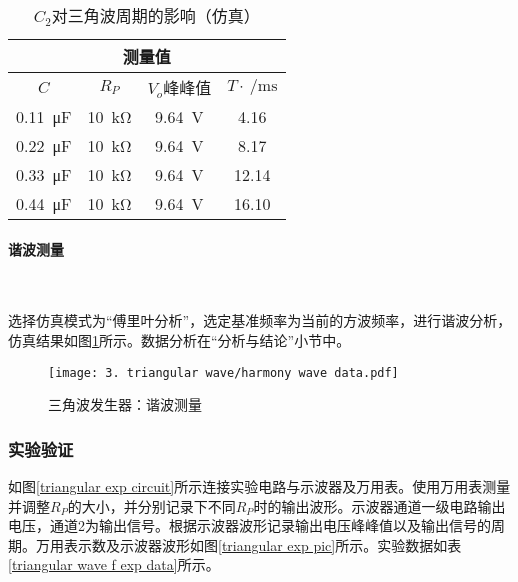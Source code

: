 \documentclass[UTF8]{ctexart}
\numberwithin{figure}{subsection}
\numberwithin{table}{subsection}
\numberwithin{equation}{subsection}
\begin{document}
\begin{table}[h]
    \begin{center}
        \caption{\(C_2\)对三角波周期的影响（仿真）}
        \begin{tabular}{|c|c|c|c|}
            \hline
            \multicolumn{4}{|c|}{测量值} \\
            \hline
            \(C\) & \(R_P\) & \(V_o\)峰峰值 & \(T\cdot\SI{}{\per\milli\second}\)\\
            \hline
            \SI{0.11}{\micro\farad} & \SI{10}{\kilo\ohm} & \SI{9.64}{\volt} & 4.16 \\
            \hline
            \SI{0.22}{\micro\farad} & \SI{10}{\kilo\ohm} & \SI{9.64}{\volt} & 8.17 \\
            \hline
            \SI{0.33}{\micro\farad} & \SI{10}{\kilo\ohm} & \SI{9.64}{\volt} & 12.14 \\
            \hline
            \SI{0.44}{\micro\farad} & \SI{10}{\kilo\ohm} & \SI{9.64}{\volt} & 16.10 \\
            \hline
        \end{tabular}
    \end{center}
    \label{triangular wave f sim data c change}
\end{table}


\paragraph{谐波测量}~{}
\par 选择仿真模式为“傅里叶分析”，选定基准频率为当前的方波频率，进行谐波分析，仿真结果如图\ref{triangular sim harmony wave data}所示。数据分析在“分析与结论”小节中。


\begin{figure}[H]
    \begin{center}
        \caption{三角波发生器：谐波测量}
        \texttt{[image: 3. triangular wave/harmony wave data.pdf]}
        \label{triangular sim harmony wave data}
    \end{center}
\end{figure}




\subsubsection{实验验证}
\par 如图\ref{triangular exp circuit}所示连接实验电路与示波器及万用表。使用万用表测量并调整\(R_P\)的大小，并分别记录下不同\(R_P\)时的输出波形。示波器通道一级电路输出电压，通道2为输出信号。根据示波器波形记录输出电压峰峰值以及输出信号的周期。万用表示数及示波器波形如图\ref{triangular exp pic}所示。实验数据如表\ref{triangular wave f exp data}所示。
\end{document}
